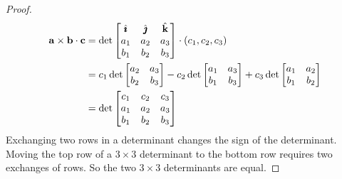 \begin{proof}
\begin{align*}
\mathbf{a}\times\mathbf{b}\cdot\mathbf{c}
&=\det\left[\begin{matrix}\hat{\pmb{\imath}}&\hat{\pmb{\jmath}}&\hat{\mathbf{k}}\\
                     a_1&a_2&a_3\\
                     b_1&b_2&b_3\end{matrix}\right]\cdot(c_1,c_2,c_3)\\
&=c_1\det\left[\begin{matrix}
                                       a_2&a_3\\
                                       b_2&b_3\end{matrix}\right]
                             -c_2\det\left[\begin{matrix}
                                       a_1&a_3\\
                                       b_1&b_3\end{matrix}\right]
                             +c_3\det\left[\begin{matrix}
                                       a_1&a_2\\
                                       b_1&b_2\end{matrix}\right]\\
&=\det\left[\begin{matrix}c_1&c_2&c_3\cr a_1&a_2&a_3\\
                                       b_1&b_2&b_3\\
                                       \end{matrix}\right]
\end{align*}
Exchanging two rows in a determinant changes the sign of the determinant.
Moving the top row of a $3\times 3$ determinant to the bottom row requires
two exchanges of rows.
So the two $3\times 3$ determinants are equal.


\end{proof}
